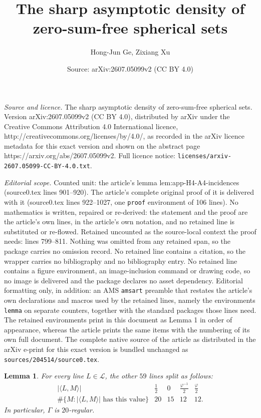 \documentclass[10pt,a4paper]{amsart}
\title{The sharp asymptotic density of zero-sum-free spherical sets}
\author{Hong-Jun Ge, Zixiang Xu}
\date{Source: arXiv:2607.05099v2 (CC BY 4.0)}
\newtheorem{lemma}{Lemma}
\begin{document}
\maketitle

\noindent\emph{Source and licence.} The sharp asymptotic density of zero-sum-free spherical sets. Version arXiv:2607.05099v2 (CC BY 4.0), distributed by arXiv under the Creative Commons Attribution 4.0 International licence, http://creativecommons.org/licenses/by/4.0/, as recorded in the arXiv licence metadata for this exact version and shown on the abstract page https://arxiv.org/abs/2607.05099v2. Full licence notice: \texttt{licenses/arxiv-2607.05099-CC-BY-4.0.txt}.\par\smallskip

\noindent\textit{Editorial scope.} Counted unit: the article's lemma lem:app-H4-A4-incidences (source0.tex lines 901--920). The article's complete original proof of it is delivered with it (source0.tex lines 922--1027, one \texttt{proof} environment of 106 lines). No mathematics is written, repaired or re-derived: the statement and the proof are the article's own lines, in the article's own notation, and no retained line is substituted or re-flowed.  Retained uncounted as the source-local context the proof needs: lines 799--811.  Nothing was omitted from any retained span, so the package carries no omission record.  No retained line contains a citation, so the wrapper carries no bibliography and no bibliography entry.  No retained line contains a figure environment, an image-inclusion command or drawing code, so no image is delivered and the package declares no asset dependency.  Editorial formatting only, in addition: an AMS \texttt{amsart} preamble that restates the article's own declarations and macros used by the retained lines, namely the environments \texttt{lemma} on separate counters, together with the standard packages those lines need.  The retained environments print in this document as Lemma 1 in order of appearance, whereas the article prints the same items with the numbering of its own full document.  The complete native source of the article as distributed in the arXiv e-print for this exact version is bundled unchanged as \texttt{sources/204514/source0.tex}.
\begin{lemma}\label{lem:app-H4-line-valencies}
For every line \(L\in\mathcal L\), the other \(59\) lines split as follows:
\begin{equation}\label{eq:app-H4-line-valencies}
\begin{array}{c|cccc}
|\langle L,M\rangle|
& \frac{1}{2} & 0 & \frac{\varphi^{-1}}{2} & \frac{\varphi}{2} \\
\hline
\#\{M:|\langle L,M\rangle|\text{ has this value}\}
& 20 & 15 & 12 & 12 .
\end{array}
\end{equation}
In particular, \(\Gamma\) is \(20\)-regular.
\end{lemma}
\end{document}
